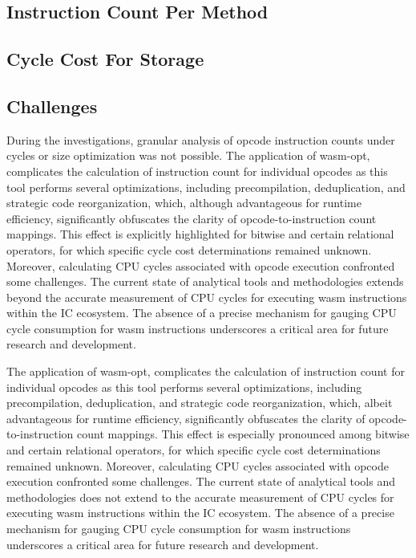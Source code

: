 \subsection{Instruction Count Per Method}

\subsection{Cycle Cost For Storage}

\subsection{Challenges}

During the investigations, granular analysis of opcode instruction counts under cycles or size optimization was not possible. The application of wasm-opt, complicates the calculation of instruction count for individual opcodes as this tool performs several optimizations, including precompilation, deduplication, and strategic code reorganization, which, although advantageous for runtime efficiency, significantly obfuscates the clarity of opcode-to-instruction count mappings. This effect is explicitly highlighted for bitwise and certain relational operators, for which specific cycle cost determinations remained unknown.
Moreover, calculating CPU cycles associated with opcode execution confronted some challenges. The current state of analytical tools and methodologies extends beyond the accurate measurement of CPU cycles for executing wasm instructions within the IC ecosystem. The absence of a precise mechanism for gauging CPU cycle consumption for wasm instructions underscores a critical area for future research and development.

The application of wasm-opt, complicates the calculation of instruction count for individual opcodes as this tool performs several optimizations, including precompilation, deduplication, and strategic code reorganization, which, albeit advantageous for runtime efficiency, significantly obfuscates the clarity of opcode-to-instruction count mappings. This effect is especially pronounced among bitwise and certain relational operators, for which specific cycle cost determinations remained unknown. Moreover, calculating CPU cycles associated with opcode execution confronted some challenges. The current state of analytical tools and methodologies does not extend to the accurate measurement of CPU cycles for executing wasm instructions within the IC ecosystem. The absence of a precise mechanism for gauging CPU cycle consumption for wasm instructions underscores a critical area for future research and development.